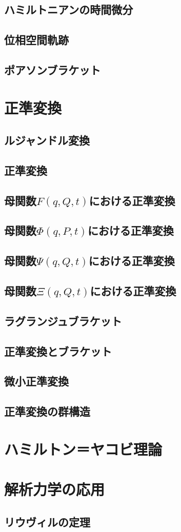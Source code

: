 \documentclass[a4paper]{jsreport}
\begin{document}
        \section{ハミルトニアンの時間微分}
        \section{位相空間軌跡}
        \section{ポアソンブラケット}


    \chapter{正準変換}
        \section{ルジャンドル変換}
        \section{正準変換}
        \section{母関数$F(q, Q, t)$における正準変換}
        \section{母関数$\Phi(q, P, t)$における正準変換}
        \section{母関数$\Psi(q, Q, t)$における正準変換}
        \section{母関数$\Xi(q, Q, t)$における正準変換}
        \section{ラグランジュブラケット}
        \section{正準変換とブラケット}
        \section{微小正準変換}
        \section{正準変換の群構造}
    \chapter{ハミルトン＝ヤコビ理論}

    \chapter{解析力学の応用}
        \section{リウヴィルの定理}
\end{document}
